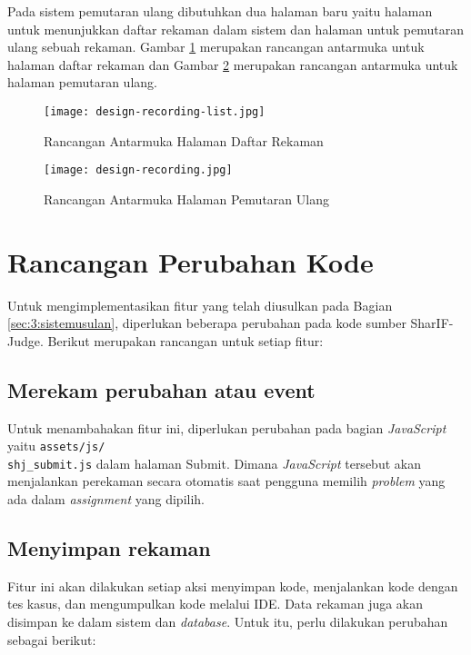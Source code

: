 Pada sistem pemutaran ulang dibutuhkan dua halaman baru yaitu halaman untuk menunjukkan daftar rekaman dalam sistem dan halaman untuk pemutaran ulang sebuah rekaman. Gambar \ref{fig:4:1:listrec} merupakan rancangan antarmuka untuk halaman daftar rekaman dan Gambar \ref{fig:4:1:rec} merupakan rancangan antarmuka untuk halaman pemutaran ulang.

\begin{figure}[H]
    \centering
    \texttt{[image: design-recording-list.jpg]}
    \caption{Rancangan Antarmuka Halaman Daftar Rekaman}
    \label{fig:4:1:listrec}
\end{figure}

\begin{figure}[H]
    \centering
    \texttt{[image: design-recording.jpg]}
    \caption{Rancangan Antarmuka Halaman Pemutaran Ulang}
    \label{fig:4:1:rec}
\end{figure}

\section{Rancangan Perubahan Kode}

Untuk mengimplementasikan fitur yang telah diusulkan pada Bagian \ref{sec:3:sistemusulan}, diperlukan beberapa perubahan pada kode sumber SharIF-Judge. Berikut merupakan rancangan untuk setiap fitur:

\subsection{Merekam perubahan atau event}
\label{sub:4:3:merekam}

Untuk menambahakan fitur ini, diperlukan perubahan pada bagian \textit{JavaScript} yaitu \verb|assets/js/|\\\verb|shj_submit.js| dalam halaman Submit. Dimana \textit{JavaScript} tersebut akan menjalankan perekaman secara otomatis saat pengguna memilih \textit{problem} yang ada dalam \textit{assignment} yang dipilih.

\subsection{Menyimpan rekaman}
\label{sub:4:3:menyimpanrekaman}

Fitur ini akan dilakukan setiap aksi menyimpan kode, menjalankan kode dengan tes kasus, dan mengumpulkan kode melalui IDE. Data rekaman juga akan disimpan ke dalam sistem dan \textit{database}. Untuk itu, perlu dilakukan perubahan sebagai berikut:

